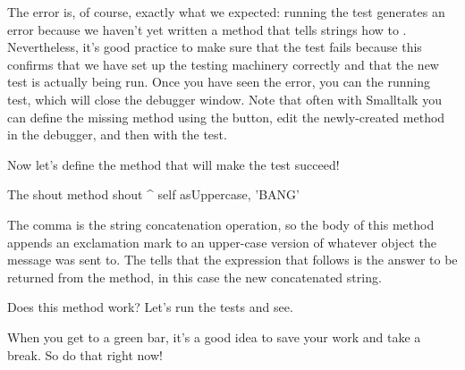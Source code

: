 \documentclass[a4paper,10pt,twoside]{book}
\begin{document}
The error is, of course, exactly what we expected:  running the test generates an error because we haven't yet written a method that tells strings how to .  
Nevertheless, it's good practice to make sure that the test fails because this confirms that we have set up the testing machinery correctly and that the new test is actually being run.
Once you have seen the error, you can  the running test, which will close the debugger window.
Note that often with Smalltalk you can define the missing method using the  button, edit the newly-created method in the debugger, and then  with the test.

Now let's define the method that will make the test succeed!

\begin{method}[shout]{The shout method}
shout
	^ self asUppercase, 'BANG'
\end{method}

The comma is the string concatenation operation, so the body of this method appends an exclamation mark to an upper-case version of whatever  object the  message was sent to.
The \ct{^} tells \sq that the expression that follows is the answer to be returned from the method, in this case the new concatenated string.

Does this method work?  Let's run the tests and see.

When you get to a green bar\footnotemark, it's a good idea to save your work and take a break.  
So do that right now!
\end{document}
